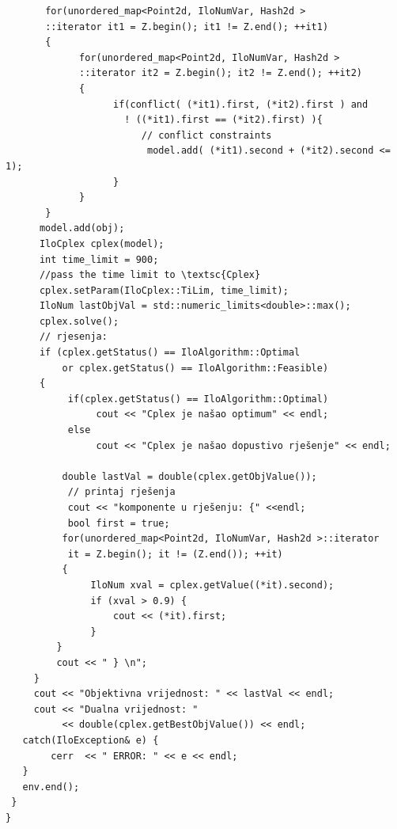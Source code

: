 \documentclass[b5paper, utf8, 11pt, colorlinks]{book}
\theoremstyle{definition}
\begin{document}
\begin{verbatim}
       for(unordered_map<Point2d, IloNumVar, Hash2d >
       ::iterator it1 = Z.begin(); it1 != Z.end(); ++it1)
       {
	         for(unordered_map<Point2d, IloNumVar, Hash2d >
	         ::iterator it2 = Z.begin(); it2 != Z.end(); ++it2)
	         {
		           if(conflict( (*it1).first, (*it2).first ) and  
		             ! ((*it1).first == (*it2).first) ){   
		             	// conflict constraints
			             model.add( (*it1).second + (*it2).second <= 1);
		           }
	         }
       }
      model.add(obj);
      IloCplex cplex(model);
      int time_limit = 900;
      //pass the time limit to \textsc{Cplex}
      cplex.setParam(IloCplex::TiLim, time_limit); 
      IloNum lastObjVal = std::numeric_limits<double>::max();
      cplex.solve();  
      // rjesenja:
      if (cplex.getStatus() == IloAlgorithm::Optimal 
          or cplex.getStatus() == IloAlgorithm::Feasible)
      {
    	   if(cplex.getStatus() == IloAlgorithm::Optimal)
    	        cout << "Cplex je našao optimum" << endl;
    	   else
    	        cout << "Cplex je našao dopustivo rješenje" << endl;
    	      
    	  double lastVal = double(cplex.getObjValue());
    	   // printaj rješenja
    	   cout << "komponente u rješenju: {" <<endl;
    	   bool first = true;
    	  for(unordered_map<Point2d, IloNumVar, Hash2d >::iterator
    	   it = Z.begin(); it != (Z.end()); ++it)
    	  {
               IloNum xval = cplex.getValue((*it).second);
    	       if (xval > 0.9) {
                   cout << (*it).first;
    	       }
         }
         cout << " } \n";  
     }
     cout << "Objektivna vrijednost: " << lastVal << endl;
     cout << "Dualna vrijednost: " 
          << double(cplex.getBestObjValue()) << endl;
   catch(IloException& e) {
     	cerr  << " ERROR: " << e << endl;
   }
   env.end();
 }
} 
\end{verbatim}

\end{document}
